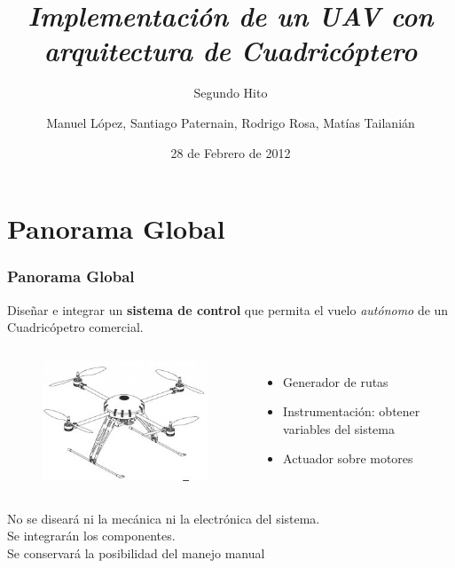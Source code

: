 \documentclass[slidestop,compress,mathserif,xcolor=svgnames,table]{beamer}
\author{Manuel L\'opez, Santiago Paternain, Rodrigo Rosa, Mat\'ias Tailani\'an}
\date{28 de Febrero de 2012}
\title{\textit{Implementaci\'on de un UAV con arquitectura de Cuadric\'optero}}
\subtitle{Segundo Hito}
\begin{document}
\frame[plain]{
  \titlepage
}

\section{Panorama Global}
\begin{frame}
\frametitle{Panorama Global}

Dise\~nar e integrar un \textbf{sistema de control} que permita el vuelo \emph{aut\'onomo} de un Cuadric\'opetro comercial.
\pause

\begin{columns}

\column{2.2in}

\begin{figure}[h!]
  \begin{center}
  \includegraphics[width=.85\textwidth]{./Pics/quad.jpg}
  \end{center}
\end{figure}

\column{2.2in}

\begin{itemize}
	\item Generador de rutas\pause
	\item Instrumentaci\'on: obtener variables del sistema \pause
	\item Actuador sobre motores
\end{itemize}

\end{columns}
\pause
\vspace{15pt}
No se disear\'a ni la mec\'anica ni la electr\'onica del sistema.\\
Se integrar\'an los componentes.\\
Se conservar\'a la posibilidad del manejo manual

\end{frame}
\end{document}
